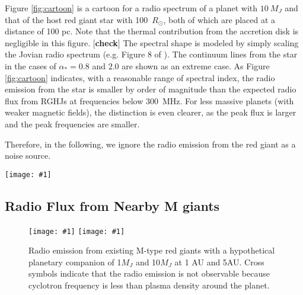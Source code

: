 \documentclass[iop,numberedappendix,apj]{emulateapj}
\def\memoYF#1{\color{red}$[${\bf #1}$]$ \color{black}}
\def\plotonesc#1{\centering \leavevmode
\texttt{[image: \#1]}}
\def\plotoneh#1{\centering \leavevmode
\texttt{[image: \#1]}}
\begin{document}
Figure \ref{fig:cartoon} is a cartoon for a radio spectrum of a planet with $10~M_J$ and that of the host red giant star with 100~$R_{\odot }$, both of which are placed at a distance of 100 pc. 
Note that the thermal contribution from the accretion disk is negligible in this figure. \memoYF{check} 
The spectral shape is modeled by simply scaling the Jovian radio spectrum (e.g. Figure 8 of \cite{zarka_et_al2004}). 
The continuum lines from the star in the cases of $\alpha_* =0.8$ and $2.0$ are shown as an extreme case. %
As Figure \ref{fig:cartoon} indicates, with a reasonable range of spectral index, the radio emission from the star is smaller by order of magnitude than the expected radio flux from RGHJs at frequencies below 300~MHz. 
For less massive planets (with weaker magnetic fields), the distinction is even clearer, as the peak flux is larger and the peak frequencies are smaller. 


Therefore, in the following, we ignore the radio emission from the red giant as a noise source. 


\begin{figure*}[tbp]
   \plotonesc{cartoon_10Mj_100pc_smooth.pdf}
   \caption{A cartoon of radio emission spectra of a RGHJ with 10$M_J$ and the host red giants with 100 $R_{\odot }$.
The spectrum of RGHJ is modeled after Jovian radio spectra, e.g. figure 8 of \citet{zarka_et_al2004} and figure 2 of \citet{griesmeier2007a}; contribution from Io is not shown here.
The spectra of the host red giant are modeled simply by extrapolating observed radio spectra above 1~GHz with power law. }
  \label{fig:cartoon}
\end{figure*}


\subsection{Radio Flux from Nearby M giants}
\label{ss:actualMgiants}

\begin{figure}[tbhp]
   \plotoneh{radio_1Mp.pdf}
   \plotoneh{radio_10Mp.pdf}
   \caption{Radio emission from existing M-type red giants with a hypothetical planetary companion of 1$M_J$ and 10$M_J$ at 1 AU and 5AU.
Cross symbols indicate that the radio emission is not observable because cyclotron frequency is less than plasma density around the planet. }
  \label{fig:observability}
\end{figure}
\end{document}

